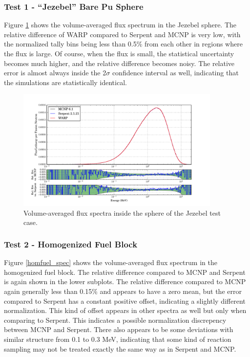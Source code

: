 \documentclass[preprint,12pt]{elsarticle}
\begin{document}
\newpage
\subsubsection{Test 1 - ``Jezebel'' Bare Pu Sphere}

Figure \ref{jezebel_spec} shows the volume-averaged flux spectrum in the Jezebel sphere.  The relative difference of WARP compared to Serpent and MCNP is very low, with the normalized tally bins being less than 0.5\% from each other in regions where the flux is large.  Of course, when the flux is small, the statistical uncertainty becomes much higher, and the relative difference becomes noisy.   The relative error is almost always inside the 2$\sigma$ confidence interval as well, indicating that the simulations are statistically identical. 

\begin{figure}[h!]
\centering
\includegraphics[width=0.9\textwidth,trim= 1cm 0cm 1cm 0cm]{graphics/jezebel_spec.pdf}
\caption{Volume-averaged flux spectra inside the sphere of the Jezebel test case. \label{jezebel_spec} }
\end{figure}

\newpage
\subsubsection{Test 2 - Homogenized Fuel Block}

Figure \ref{homfuel_spec} shows the volume-averaged flux spectrum in the homogenized fuel block.  The relative difference compared to MCNP and Serpent is again shown in the lower subplots.  The relative difference compared to MCNP again generally less than 0.15\% and appears to have a zero mean, but the error compared to Serpent has a constant positive offset, indicating a slightly different normalization.  This kind of offset appears in other spectra as well but only when comparing to Serpent.  This indicates a possible normalization discrepency between MCNP and Serpent.  There also appears to be some  deviations with similar structure from 0.1 to 0.3 MeV, indicating that some kind of reaction sampling may not be treated exactly the same way as in Serpent and MCNP.
\end{document}
